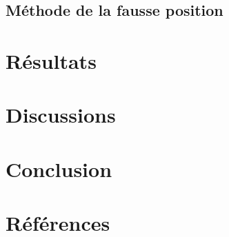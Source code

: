 \documentclass[12pt]{article}
\begin{document}
\subsection{Méthode de la fausse position}
\label{ref:fausse-position}



\section{Résultats}
\label{ref:resultats}


\section{Discussions}
\label{ref:discussions}


\section{Conclusion}



\section{Références}
\label{ref:Références}
\end{document}
